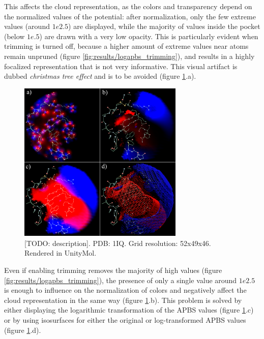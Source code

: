     This affects the cloud representation, as the colors and transparency depend on the normalized values of the potential: after normalization, only the few extreme values (around $1e2.5$) are displayed, while the majority of values inside the pocket (below $1e.5$) are drawn with a very low opacity. This is particularly evident when trimming is turned off, because a higher amount of extreme values near atoms remain unpruned (figure \ref{fig:results/logapbs_trimming}), and results in a highly focalized representation that is not very informative. This visual artifact is dubbed \textit{christmas tree effect} and is to be avoided (figure \ref{fig:results/apbs_christmas}.a).

    \begin{figure}[H]
      \centering
      \includegraphics[width=0.7\textwidth]{figures/results/apbs_christmas.png}
      \caption{\label{fig:results/apbs_christmas} [TODO: description]. PDB: 1IQ. Grid resolution: 52x49x46. Rendered in UnityMol.}
    \end{figure}

    Even if enabling trimming removes the majority of high values (figure \ref{fig:results/logapbs_trimming}), the presence of only a single value around $1e2.5$ is enough to influence on the normalization of colors and negatively affect the cloud representation in the same way (figure \ref{fig:results/apbs_christmas}.b). This problem is solved by either displaying the logarithmic transformation of the APBS values (figure \ref{fig:results/apbs_christmas}.c) or by using isosurfaces for either the original or log-transformed APBS values (figure \ref{fig:results/apbs_christmas}.d).


